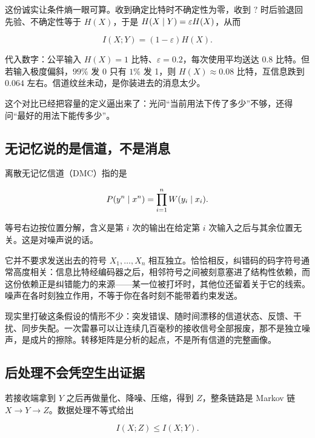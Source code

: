 这份诚实让条件熵一眼可算。收到确定比特时不确定性为零，收到 \(?\) 时后验退回先验、不确定性等于 \(H(X)\)，于是 \(H(X\mid Y)=\varepsilon H(X)\)，从而

\[
I(X;Y)=(1-\varepsilon)H(X).
\]

代入数字：公平输入 \(H(X)=1\) 比特、\(\varepsilon=0.2\)，每次使用平均送达 \(0.8\) 比特。但若输入极度偏斜，\(99\%\) 发 0 只有 \(1\%\) 发 1，则 \(H(X)\approx0.08\) 比特，互信息跌到 \(0.064\) 左右。信道纹丝未动，是你装进去的消息太少。

这个对比已经把容量的定义逼出来了：光问``当前用法下传了多少''不够，还得问``最好的用法下能传多少''。

\subsection{无记忆说的是信道，不是消息}

离散无记忆信道（DMC）指的是

\[
P(y^n\mid x^n)=\prod_{i=1}^n W(y_i\mid x_i).
\]

等号右边按位置分解，含义是第 \(i\) 次的输出在给定第 \(i\) 次输入之后与其余位置无关。这是对噪声说的话。

它并不要求发送出去的符号 \(X_1,\dots,X_n\) 相互独立。恰恰相反，纠错码的码字符号通常高度相关：信息比特经编码器之后，相邻符号之间被刻意塞进了结构性依赖，而这份依赖正是纠错能力的来源——某一位被打坏时，其他位还留着关于它的线索。噪声在各时刻独立作用，不等于你在各时刻不能带着约束发送。

现实里打破这条假设的情形不少：突发错误、随时间漂移的信道状态、反馈、干扰、同步失配。一次雷暴可以让连续几百毫秒的接收信号全部报废，那不是独立噪声，是成片的擦除。转移矩阵是分析的起点，不是所有信道的完整画像。

\subsection{后处理不会凭空生出证据}

若接收端拿到 \(Y\) 之后再做量化、降噪、压缩，得到 \(Z\)，整条链路是 Markov 链 \(X\to Y\to Z\)。数据处理不等式给出

\[
I(X;Z)\le I(X;Y).
\]

